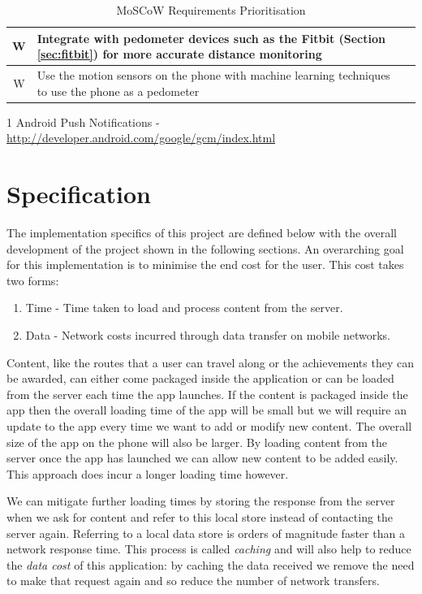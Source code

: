 \begin{table}[h]
\begin{threeparttable}[b]
\begin{tabular}{ | c | p{12cm} | c | }
    \\\hline
    W & Integrate with pedometer devices such as the Fitbit (Section
    \ref{sec:fitbit}) for more accurate distance monitoring &
    \\\hline
    W & Use the motion sensors on the phone with machine learning
    techniques to use the phone as a pedometer & \\\hline
  \end{tabular}
  \begin{tablenotes}
    \item[1] Android Push Notifications - \url{http://developer.android.com/google/gcm/index.html}
  \end{tablenotes}
  \caption{MoSCoW Requirements Prioritisation}
  \label{table:moscow}
  \end{threeparttable}
\end{table}

\section{Specification}
\label{sec:specification}
The implementation specifics of this project are defined below with
the overall development of the project shown in the following sections.
An overarching goal for this implementation is to minimise the end cost
for the user. This cost takes two forms: 
\begin{enumerate}
\item Time - Time taken to load and process content from the server.
\item Data - Network costs incurred through data transfer on mobile networks.
\end{enumerate}

Content, like the routes that a user can travel along or the
achievements they can be awarded, can either come packaged inside the
application or can be loaded from the server each time the app
launches. If the content is packaged inside the app then the overall
loading time of the app will be small but we will require an update to
the app every time we want to add or modify new content. The overall
size of the app on the phone will also be larger. By loading content
from the server once the app has launched we can allow new content to
be added easily. This approach does incur a longer loading time however.

We can mitigate further loading times by storing the response from the
server when we ask for content and refer to this local store
instead of contacting the server again. Referring to a local data
store is orders of magnitude faster than a network response time. This
process is called \emph{caching} and will also help to reduce the
\emph{data cost} of this application: by caching the data received we
remove the need to make that request again and so reduce the number of
network transfers. 

